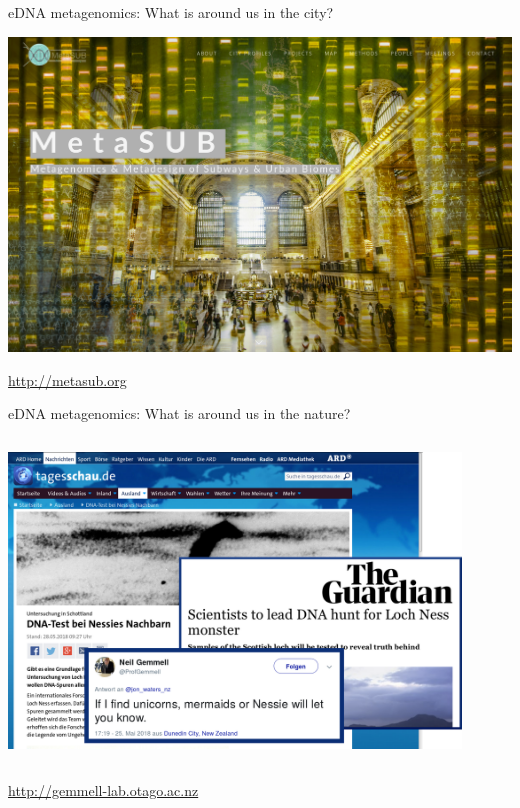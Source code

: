 \documentclass[10pt]{beamer}
\begin{document}
\begin{frame}{eDNA metagenomics: What is around us in the city?}
	\begin{center}
		\includegraphics[width=\textwidth]{./figures/metasub.png} \\
	\end{center}
	\url{http://metasub.org}
\end{frame}

\begin{frame}{eDNA metagenomics: What is around us in the nature?}
	\begin{columns}
		\column{\dimexpr\paperwidth-10pt}
		\begin{center}
			\includegraphics[width=0.9\textwidth]{./figures/tagesschau-nessie.png}\par
		\end{center}
	\end{columns}
	\url{http://gemmell-lab.otago.ac.nz}
\end{frame}
\end{document}
